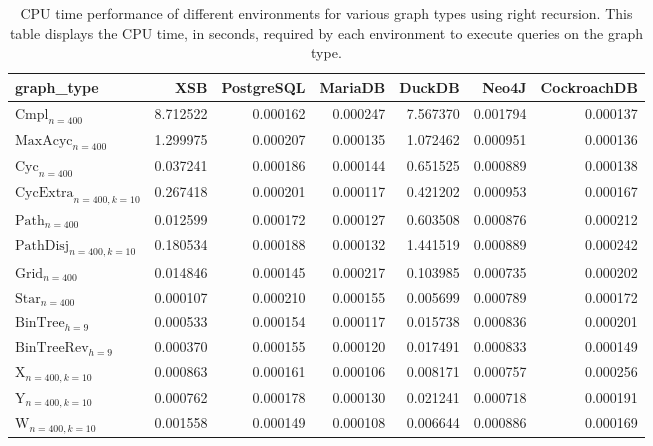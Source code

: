 \begin{table}
\caption{CPU time performance of different environments for various graph types using right recursion. This table displays the CPU time, in seconds, required by each environment to execute queries on the graph type.}
\label{table:results}
\begin{tabular}{lrrrrrr}
\toprule
graph_type & XSB & PostgreSQL & MariaDB & DuckDB & Neo4J & CockroachDB \\
\midrule
$\text{Cmpl}_{n=400}$ & 8.712522 & 0.000162 & 0.000247 & 7.567370 & 0.001794 & 0.000137 \\
$\text{MaxAcyc}_{n=400}$ & 1.299975 & 0.000207 & 0.000135 & 1.072462 & 0.000951 & 0.000136 \\
$\text{Cyc}_{n=400}$ & 0.037241 & 0.000186 & 0.000144 & 0.651525 & 0.000889 & 0.000138 \\
$\text{CycExtra}_{n=400,k=10}$ & 0.267418 & 0.000201 & 0.000117 & 0.421202 & 0.000953 & 0.000167 \\
$\text{Path}_{n=400}$ & 0.012599 & 0.000172 & 0.000127 & 0.603508 & 0.000876 & 0.000212 \\
$\text{PathDisj}_{n=400,k=10}$ & 0.180534 & 0.000188 & 0.000132 & 1.441519 & 0.000889 & 0.000242 \\
$\text{Grid}_{n=400}$ & 0.014846 & 0.000145 & 0.000217 & 0.103985 & 0.000735 & 0.000202 \\
$\text{Star}_{n=400}$ & 0.000107 & 0.000210 & 0.000155 & 0.005699 & 0.000789 & 0.000172 \\
$\text{BinTree}_{h=9}$ & 0.000533 & 0.000154 & 0.000117 & 0.015738 & 0.000836 & 0.000201 \\
$\text{BinTreeRev}_{h=9}$ & 0.000370 & 0.000155 & 0.000120 & 0.017491 & 0.000833 & 0.000149 \\
$\text{X}_{n=400, k=10}$ & 0.000863 & 0.000161 & 0.000106 & 0.008171 & 0.000757 & 0.000256 \\
$\text{Y}_{n=400,k=10}$ & 0.000762 & 0.000178 & 0.000130 & 0.021241 & 0.000718 & 0.000191 \\
$\text{W}_{n=400,k=10}$ & 0.001558 & 0.000149 & 0.000108 & 0.006644 & 0.000886 & 0.000169 \\
\bottomrule
\end{tabular}
\end{table}
